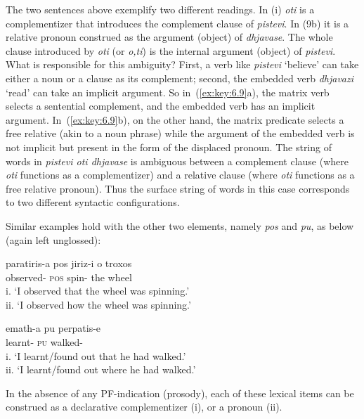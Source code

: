 \documentclass[output=paper]{langsci/langscibook}
\begin{document}
The two sentences above exemplify two different readings. In (i) \emph{oti} is
a complementizer that introduces the complement clause of \emph{pistevi}. In
(9b) it is a relative pronoun construed as the argument (object) of
\emph{dhjavase}. The whole clause introduced by \emph{oti} (or \emph{o,ti}) is
the internal argument (object) of \emph{pistevi}. What is responsible for this
ambiguity? First, a verb like \emph{pistevi} \enquote*{believe} can take either a noun
or a clause as its complement; second, the embedded verb \emph{dhjavazi}
\enquote*{read} can take an implicit argument. So in~(\ref{ex:key:6.9}a), the matrix verb
selects a sentential complement, and the embedded verb has an implicit
argument. In~(\ref{ex:key:6.9}b), on the other hand, the matrix predicate selects a free
relative (akin to a noun phrase) while the argument of the embedded verb is not
implicit but present in the form of the displaced pronoun. The string of words
in \emph{pistevi oti dhjavase} is ambiguous between a complement clause (where
\emph{oti} functions as a complementizer) and a relative clause (where
\emph{oti} functions as a free relative pronoun). Thus the surface string of
words in this case corresponds to two different syntactic configurations.

Similar examples hold with the other two elements, namely \emph{pos} and
\emph{pu}, as below (again left unglossed):

\ea\label{ex:key:6.10} 
    \sn
	\gll paratiris-a  pos jiriz-i o troxos\\
		observed-\Fsg{} \textsc{pos} spin-\Tsg{} the wheel\\
	\glt i.  \enquote*{I observed that the wheel was spinning.}\\
		ii.  \enquote*{I observed how the wheel was spinning.}
\z

\ea\label{ex:key:6.11} 
    \sn
    \gll    emath-a pu perpatis-e\\
            learnt-\Fsg{} \textsc{pu} walked-\Tsg{}  \\
	\glt    i.  \enquote*{I learnt/found out that he had walked.}\\
		    ii.  \enquote*{I learnt/found out where he had walked.}
\z

In the absence of any PF-indication (prosody), each of these lexical items can
be construed as a declarative complementizer (i), or a
pronoun (ii).
\end{document}
